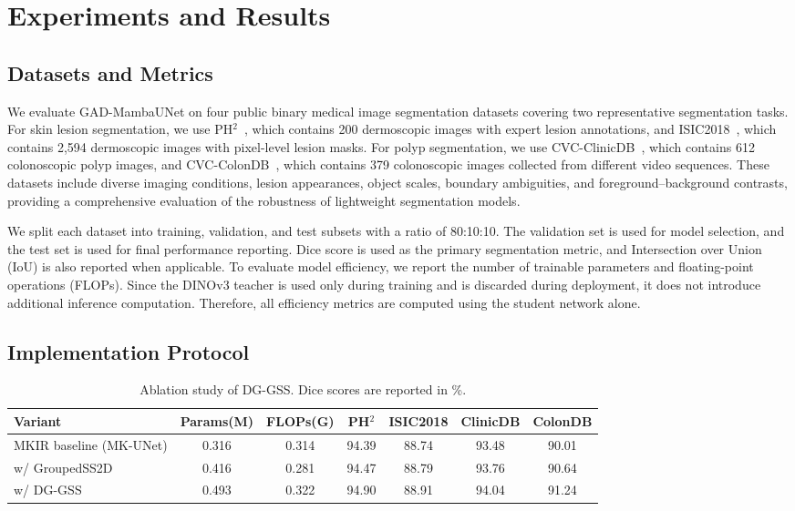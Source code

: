 
\section{Experiments and Results}
\label{sec:experiments}

\subsection{Datasets and Metrics}

We evaluate GAD-MambaUNet on four public binary medical image segmentation datasets covering two representative segmentation tasks. For skin lesion segmentation, we use PH$^2$~\cite{mendoncca2013ph}, which contains 200 dermoscopic images with expert lesion annotations, and ISIC2018~\cite{codella2019skin}, which contains 2,594 dermoscopic images with pixel-level lesion masks. For polyp segmentation, we use CVC-ClinicDB~\cite{bernal2015clinicdb}, which contains 612 colonoscopic polyp images, and CVC-ColonDB~\cite{tajbakhsh2016colondb,vazquez2017benchmark}, which contains 379 colonoscopic images collected from different video sequences. These datasets include diverse imaging conditions, lesion appearances, object scales, boundary ambiguities, and foreground--background contrasts, providing a comprehensive evaluation of the robustness of lightweight segmentation models.

We split each dataset into training, validation, and test subsets with a ratio of 80:10:10. The validation set is used for model selection, and the test set is used for final performance reporting. Dice score is used as the primary segmentation metric, and Intersection over Union (IoU) is also reported when applicable. To evaluate model efficiency, we report the number of trainable parameters and floating-point operations (FLOPs). Since the DINOv3 teacher is used only during training and is discarded during deployment, it does not introduce additional inference computation. Therefore, all efficiency metrics are computed using the student network alone.

\subsection{Implementation Protocol}



\begin{table}[t]
\centering
\caption{Ablation study of DG-GSS. Dice scores are reported in \%.}
\label{tab:ablation_dggss}
\scriptsize
\begin{tabular}{lcccccc}
\hline
Variant & Params(M) & FLOPs(G) & PH$^2$ & ISIC2018 & ClinicDB & ColonDB \\
\hline
MKIR baseline (MK-UNet) & 0.316 & 0.314 & 94.39 & 88.74 & 93.48 & 90.01 \\
w/ GroupedSS2D & 0.416 & 0.281 & 94.47 & 88.79 & 93.76 & 90.64 \\
w/ DG-GSS & 0.493 & 0.322 & 94.90 & 88.91 & 94.04 & 91.24 \\
\hline
\end{tabular}
\end{table}

